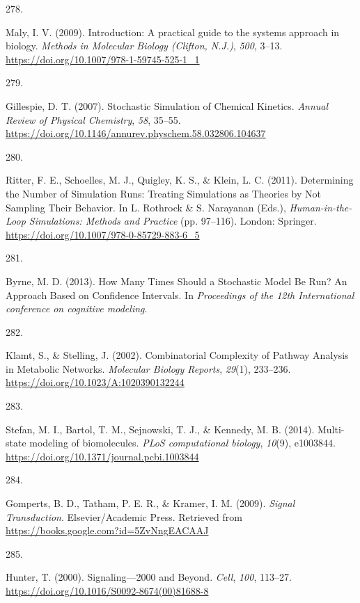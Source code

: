 \documentclass[
  11pt,
  letterpaper,
]{scrreprt}
\newlength{\cslhangindent}
\newlength{\csllabelwidth}
\newenvironment{CSLReferences}[2] %
 {\begin{list}{}{%
  \setlength{\itemindent}{0pt}
  \setlength{\leftmargin}{0pt}
  \setlength{\parsep}{0pt}
  \ifodd #1
   \setlength{\leftmargin}{\cslhangindent}
   \setlength{\itemindent}{-1\cslhangindent}
  \fi
  \setlength{\itemsep}{#2\baselineskip}}}
 {\end{list}}
\newcommand{\CSLLeftMargin}[1]{\parbox[t]{\csllabelwidth}{\strut#1\strut}}
\newcommand{\CSLRightInline}[1]{\parbox[t]{\linewidth - \csllabelwidth}{\strut#1\strut}}
\begin{document}
\begin{CSLReferences}{0}{0}
\CSLLeftMargin{278. }%
\CSLRightInline{Maly, I. V. (2009). Introduction: A practical guide to
the systems approach in biology. \emph{Methods in Molecular Biology
(Clifton, N.J.)}, \emph{500}, 3--13.
\url{https://doi.org/10.1007/978-1-59745-525-1_1}}

\CSLLeftMargin{279. }%
\CSLRightInline{Gillespie, D. T. (2007). Stochastic {Simulation} of
{Chemical Kinetics}. \emph{Annual Review of Physical Chemistry},
\emph{58}, 35--55.
\url{https://doi.org/10.1146/annurev.physchem.58.032806.104637}}

\CSLLeftMargin{280. }%
\CSLRightInline{Ritter, F. E., Schoelles, M. J., Quigley, K. S., \&
Klein, L. C. (2011). Determining the {Number} of {Simulation Runs}:
{Treating Simulations} as {Theories} by {Not Sampling Their Behavior}.
In L. Rothrock \& S. Narayanan (Eds.), \emph{Human-in-the-{Loop
Simulations}: {Methods} and {Practice}} (pp. 97--116). London: Springer.
\url{https://doi.org/10.1007/978-0-85729-883-6_5}}

\CSLLeftMargin{281. }%
\CSLRightInline{Byrne, M. D. (2013). How {Many Times Should} a
{Stochastic Model Be Run}? {An Approach Based} on {Confidence
Intervals}. In \emph{Proceedings of the 12th {International} conference
on cognitive modeling}.}

\CSLLeftMargin{282. }%
\CSLRightInline{Klamt, S., \& Stelling, J. (2002). Combinatorial
{Complexity} of {Pathway Analysis} in {Metabolic Networks}.
\emph{Molecular Biology Reports}, \emph{29}(1), 233--236.
\url{https://doi.org/10.1023/A:1020390132244}}

\CSLLeftMargin{283. }%
\CSLRightInline{Stefan, M. I., Bartol, T. M., Sejnowski, T. J., \&
Kennedy, M. B. (2014). Multi-state modeling of biomolecules. \emph{PLoS
computational biology}, \emph{10}(9), e1003844.
\url{https://doi.org/10.1371/journal.pcbi.1003844}}

\CSLLeftMargin{284. }%
\CSLRightInline{Gomperts, B. D., Tatham, P. E. R., \& Kramer, I. M.
(2009). \emph{Signal {Transduction}}. Elsevier/Academic Press. Retrieved
from \url{https://books.google.com?id=5ZvNngEACAAJ}}

\CSLLeftMargin{285. }%
\CSLRightInline{Hunter, T. (2000). Signaling---2000 and {Beyond}.
\emph{Cell}, \emph{100}, 113--27.
\url{https://doi.org/10.1016/S0092-8674(00)81688-8}}


\end{CSLReferences}
\end{document}
